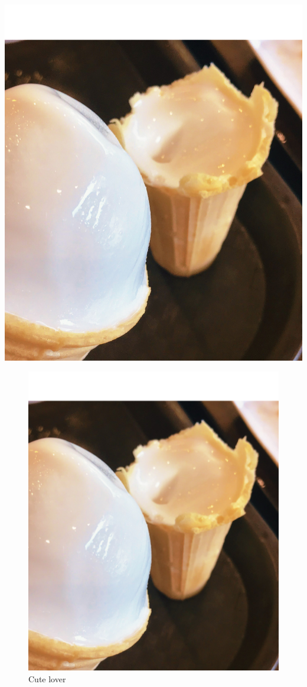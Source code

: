 \documentclass[12pt]{article}
\begin{document}
\includegraphics[scale=0.1]{cute.png}

\begin{figure}[h!]
	\centering
	\includegraphics[scale=0.5]{cute.png}
	\caption{Cute lover}
	\label{fig:cute}
\end{figure}
\end{document}
